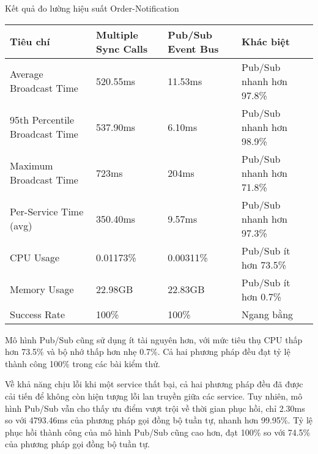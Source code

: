 \begin{table}[h]{Kết quả đo lường hiệu suất Order-Notification}
    \centering
    {\setlength{\arrayrulewidth}{1pt}
        \renewcommand{\arraystretch}{1.5}
        \setlength{\tabcolsep}{6pt}
        \begin{tabular}{|p{3.2cm}|p{3.2cm}|p{3.2cm}|p{3.2cm}|}
            \hline
            \textbf{Tiêu chí}              & \textbf{Multiple Sync Calls} & \textbf{Pub/Sub Event Bus} & \textbf{Khác biệt}       \\
            \hline
            Average Broadcast Time         & 520.55ms                     & 11.53ms                    & Pub/Sub nhanh hơn 97.8\% \\
            \hline
            95th Percentile Broadcast Time & 537.90ms                     & 6.10ms                     & Pub/Sub nhanh hơn 98.9\% \\
            \hline
            Maximum Broadcast Time         & 723ms                        & 204ms                      & Pub/Sub nhanh hơn 71.8\% \\
            \hline
            Per-Service Time (avg)         & 350.40ms                     & 9.57ms                     & Pub/Sub nhanh hơn 97.3\% \\
            \hline
            CPU Usage                      & 0.01173\%                    & 0.00311\%                  & Pub/Sub ít hơn 73.5\%    \\
            \hline
            Memory Usage                   & 22.98GB                      & 22.83GB                    & Pub/Sub ít hơn 0.7\%     \\
            \hline
            Success Rate                   & 100\%                        & 100\%                      & Ngang bằng               \\
            \hline
        \end{tabular}}
\end{table}

Mô hình Pub/Sub cũng sử dụng ít tài nguyên hơn, với mức tiêu thụ CPU thấp hơn 73.5\% và bộ nhớ thấp hơn nhẹ 0.7\%. Cả hai phương pháp đều đạt tỷ lệ thành công 100\% trong các bài kiểm thử.

Về khả năng chịu lỗi khi một service thất bại, cả hai phương pháp đều đã được cải tiến để không còn hiện tượng lỗi lan truyền giữa các service. Tuy nhiên, mô hình Pub/Sub vẫn cho thấy ưu điểm vượt trội về thời gian phục hồi, chỉ 2.30ms so với 4793.46ms của phương pháp gọi đồng bộ tuần tự, nhanh hơn 99.95\%. Tỷ lệ phục hồi thành công của mô hình Pub/Sub cũng cao hơn, đạt 100\% so với 74.5\% của phương pháp gọi đồng bộ tuần tự.

